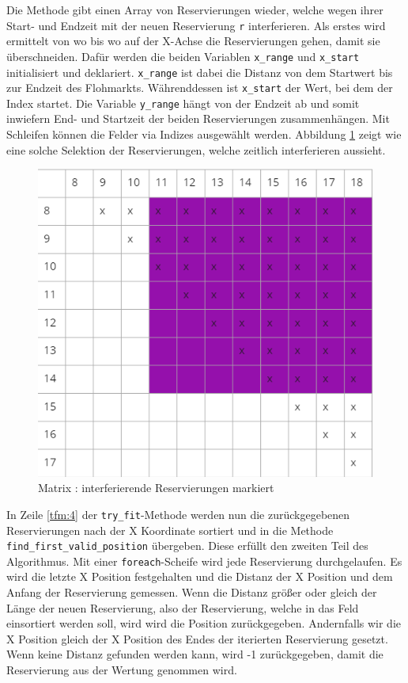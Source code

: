 Die Methode gibt einen Array von Reservierungen wieder, welche wegen ihrer Start- und Endzeit mit der neuen Reservierung \texttt{r} interferieren. Als erstes wird ermittelt von wo bis wo auf der X-Achse die Reservierungen gehen, damit sie überschneiden. Dafür werden die beiden Variablen \texttt{x\_range} und \texttt{x\_start} initialisiert und deklariert. \texttt{x\_range} ist dabei die Distanz von dem Startwert bis zur Endzeit des Flohmarkts. Währenddessen ist \texttt{x\_start} der Wert, bei dem der Index startet. Die Variable \texttt{y\_range} hängt von der Endzeit ab und somit inwiefern End- und Startzeit der beiden Reservierungen zusammenhängen. Mit Schleifen können die Felder via Indizes ausgewählt werden. Abbildung \ref{fig:matrix_selected} zeigt wie eine solche Selektion der Reservierungen, welche zeitlich interferieren aussieht.
\begin{figure}[H]
    \centering
    \includegraphics[scale=0.75]{images/matrix_selected.png}
    \caption{Matrix : interferierende Reservierungen markiert}
    \label{fig:matrix_selected}
\end{figure} \par
\newpage
In Zeile \ref{tfm:4} der \texttt{try\_fit}-Methode werden nun die zurückgegebenen Reservierungen nach der X Koordinate sortiert und in die Methode \texttt{find\_first\_valid\_position} übergeben. Diese erfüllt den zweiten Teil des Algorithmus. Mit einer \texttt{foreach}-Scheife wird jede Reservierung durchgelaufen. Es wird die letzte X Position festgehalten und die Distanz der X Position und dem Anfang der Reservierung gemessen. Wenn die Distanz größer oder gleich der Länge der neuen Reservierung, also der Reservierung, welche in das Feld einsortiert werden soll, wird wird die Position zurückgegeben. Andernfalls wir die X Position gleich der X Position des Endes der iterierten Reservierung gesetzt. Wenn keine Distanz gefunden werden kann, wird -1 zurückgegeben, damit die Reservierung aus der Wertung genommen wird.
